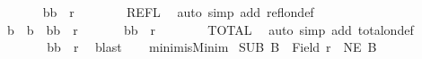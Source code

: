 \begin{isabellebody}
\ \ \ \ \ \isamarkupfalse%
\ {\isachardoublequoteopen}{\isacharparenleft}{\kern0pt}b{\isacharcomma}{\kern0pt}b{\isacharprime}{\kern0pt}{\isacharparenright}{\kern0pt}\ {\isasymin}\ r{\isachardoublequoteclose}\isanewline
\ \ \ \ \ \isamarkupfalse%
\ {\isacharasterisk}{\kern0pt}{\isacharasterisk}{\kern0pt}\ REFL\ \isamarkupfalse%
\ {\isacharparenleft}{\kern0pt}auto\ simp\ add{\isacharcolon}{\kern0pt}\ refl{\isacharunderscore}{\kern0pt}on{\isacharunderscore}{\kern0pt}def{\isacharparenright}{\kern0pt}\isanewline
\ \ \ \ \isacommand{{\isacharbraceright}{\kern0pt}}\isamarkupfalse%
\isanewline
\ \ \ \ \isamarkupfalse%
\isanewline
\ \ \ \ \isacommand{{\isacharbraceleft}{\kern0pt}}\isamarkupfalse%
\isamarkupfalse%
\ {\isachardoublequoteopen}b{\isacharprime}{\kern0pt}\ {\isasymnoteq}\ b\ {\isasymand}\ {\isacharparenleft}{\kern0pt}b{\isacharprime}{\kern0pt}{\isacharcomma}{\kern0pt}b{\isacharparenright}{\kern0pt}\ {\isasymnotin}\ r{\isachardoublequoteclose}\isanewline
\ \ \ \ \ \isamarkupfalse%
\ {\isachardoublequoteopen}{\isacharparenleft}{\kern0pt}b{\isacharcomma}{\kern0pt}b{\isacharprime}{\kern0pt}{\isacharparenright}{\kern0pt}\ {\isasymin}\ r{\isachardoublequoteclose}\isanewline
\ \ \ \ \ \isamarkupfalse%
\ {\isacharasterisk}{\kern0pt}{\isacharasterisk}{\kern0pt}\ TOTAL\ \isamarkupfalse%
\ {\isacharparenleft}{\kern0pt}auto\ simp\ add{\isacharcolon}{\kern0pt}\ total{\isacharunderscore}{\kern0pt}on{\isacharunderscore}{\kern0pt}def{\isacharparenright}{\kern0pt}\isanewline
\ \ \ \ \isacommand{{\isacharbraceright}{\kern0pt}}\isamarkupfalse%
\isanewline
\ \ \ \ \isamarkupfalse%
\ \isamarkupfalse%
\ {\isachardoublequoteopen}{\isacharparenleft}{\kern0pt}b{\isacharcomma}{\kern0pt}b{\isacharprime}{\kern0pt}{\isacharparenright}{\kern0pt}\ {\isasymin}\ r{\isachardoublequoteclose}\ \isamarkupfalse%
\ blast\isanewline
\ \ \isamarkupfalse%
\isanewline
{}\isamarkupfalse%
%
\endisatagproof
{\isafoldproof}%
%
\isadelimproof
\isanewline
%
\endisadelimproof
\isanewline
{}\isamarkupfalse%
\ minim{\isacharunderscore}{\kern0pt}isMinim{\isacharcolon}{\kern0pt}\isanewline
{}\ SUB{\isacharcolon}{\kern0pt}\ {\isachardoublequoteopen}B\ {\isasymle}\ Field\ r{\isachardoublequoteclose}\ \ NE{\isacharcolon}{\kern0pt}\ {\isachardoublequoteopen}B\ {\isasymnoteq}\ {\isacharbraceleft}{\kern0pt}{\isacharbraceright}{\kern0pt}{\isachardoublequoteclose}\isanewline

\end{isabellebody}
